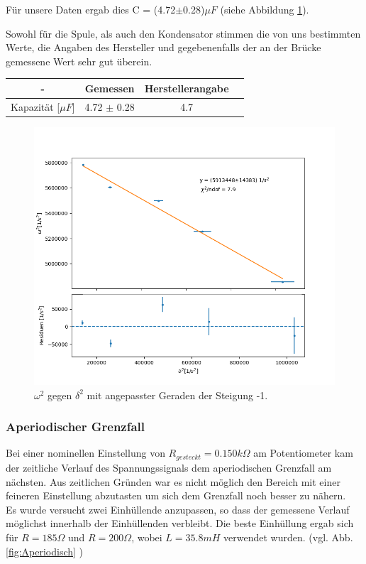 \documentclass[12pt,a4paper]{article}
\begin{document}
Für unsere Daten ergab dies C = (4.72$\pm$0.28)$\mu F$ (siehe Abbildung \ref{pic:fit_C_RLC}).

Sowohl für die Spule, als auch den Kondensator stimmen die von uns bestimmten Werte, die Angaben des Hersteller und gegebenenfalls der an der Brücke gemessene Wert sehr gut überein.


\begin{table}[H]
	\centering
	\begin{tabular}{|c|c|c|c|}
		\hline
		- & \textbf{Gemessen} & \textbf{Herstellerangabe} \\
		\hline
		Kapazität [$\mu F$] & 4.72 $\pm$ 0.28 & 4.7 \\
		\hline
	\end{tabular}
\end{table}

\begin{figure}
	\centering
	\includegraphics[width=0.8\linewidth]{Bilder/fit_C_RLC}
	\caption{$\omega^2$ gegen $\delta^2$ mit angepasster Geraden der Steigung -1.}
	\label{pic:fit_C_RLC}
\end{figure}


\subsubsection{Aperiodischer Grenzfall}
Bei einer nominellen Einstellung von $R_{gesteckt}=0.150k\Omega$ am Potentiometer kam der zeitliche Verlauf des Spannungssignals dem aperiodischen Grenzfall am nächsten. Aus zeitlichen Gründen war es nicht möglich den Bereich mit einer feineren Einstellung abzutasten um sich dem Grenzfall noch besser zu nähern.\\
Es wurde versucht zwei Einhüllende anzupassen, so dass der gemessene Verlauf möglichst innerhalb der Einhüllenden verbleibt. Die beste Einhüllung ergab sich für $R=185\Omega$ und $R=200\Omega$, wobei $L=35.8mH$ verwendet wurden. (vgl. Abb.\ref{fig:Aperiodisch} )
\end{document}
